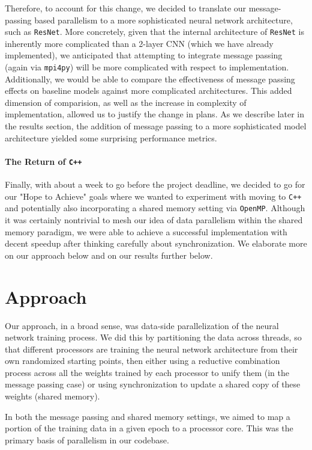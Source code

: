 \documentclass{article}
\begin{document}
Therefore, to account for this change, we decided to translate our message-passing based parallelism to a more sophisticated neural network architecture, such as \texttt{ResNet}. More concretely, given that the internal architecture of \texttt{ResNet} is inherently more complicated than a 2-layer CNN (which we have already implemented), we anticipated that attempting to integrate message passing (again via \texttt{mpi4py}) will be more complicated with respect to implementation. Additionally, we would be able to compare the effectiveness of message passing effects on baseline models against more complicated architectures. This added dimension of comparision, as well as the increase in complexity of implementation, allowed us to justify the change in plans. As we describe later in the results section, the addition of message passing to a more sophisticated model architecture yielded some surprising performance metrics.

\paragraph{The Return of \texttt{C++} }

Finally, with about a week to go before the project deadline, we decided to go for our "Hope to Achieve" goals where we wanted to experiment with moving to \texttt{C++} and potentially also incorporating a shared memory setting via \texttt{OpenMP}. Although it was certainly nontrivial to mesh our idea of data parallelism within the shared memory paradigm, we were able to achieve a successful implementation with decent speedup after thinking carefully about synchronization. We elaborate more on our approach below and on our results further below.

\section*{Approach}

Our approach, in a broad sense, was data-side parallelization of the neural network training process. We did this by partitioning the data across threads, so that different processors are training the neural network architecture from their own randomized starting points, then either using a reductive combination process across all the weights trained by each processor to unify them (in the message passing case) or using synchronization to update a shared copy of these weights (shared memory).

In both the message passing and shared memory settings, we aimed to map a portion of the training data in a given epoch to a processor core. This was the primary basis of parallelism in our codebase.
\end{document}
